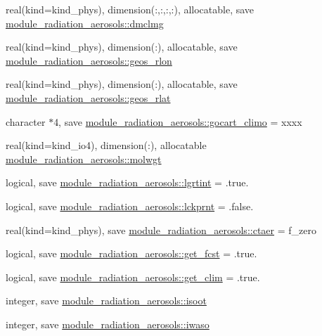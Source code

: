 \begin{DoxyCompactItemize}
\item 
real(kind=kind\+\_\+phys), dimension(\+:,\+:,\+:,\+:), allocatable, save \hyperlink{group__module__radiation__aerosols_ga123d552c7f98f7371565f4e2017efd45}{module\+\_\+radiation\+\_\+aerosols\+::dmclmg}
\item 
real(kind=kind\+\_\+phys), dimension(\+:), allocatable, save \hyperlink{group__module__radiation__aerosols_ga1a0e35ab33517e765898870b8b1ab1ad}{module\+\_\+radiation\+\_\+aerosols\+::geos\+\_\+rlon}
\item 
real(kind=kind\+\_\+phys), dimension(\+:), allocatable, save \hyperlink{group__module__radiation__aerosols_gaef43bfbd28ef9b87e8d6973ba7331a18}{module\+\_\+radiation\+\_\+aerosols\+::geos\+\_\+rlat}
\item 
character $\ast$4, save \hyperlink{group__module__radiation__aerosols_gab8118108e60a4795a8caa5af71232399}{module\+\_\+radiation\+\_\+aerosols\+::gocart\+\_\+climo} = \textquotesingle{}xxxx\textquotesingle{}
\item 
real(kind=kind\+\_\+io4), dimension(\+:), allocatable \hyperlink{group__module__radiation__aerosols_ga166e63abaa518ec795f8eea6d115f03c}{module\+\_\+radiation\+\_\+aerosols\+::molwgt}
\item 
logical, save \hyperlink{group__module__radiation__aerosols_gaa27bf6912bfd67b78381892d4f555c51}{module\+\_\+radiation\+\_\+aerosols\+::lgrtint} = .true.
\item 
logical, save \hyperlink{group__module__radiation__aerosols_ga018d5414597049069c1ddd1094285371}{module\+\_\+radiation\+\_\+aerosols\+::lckprnt} = .false.
\item 
real(kind=kind\+\_\+phys), save \hyperlink{group__module__radiation__aerosols_ga4b0aa142aee31c40361dadc390ccc68e}{module\+\_\+radiation\+\_\+aerosols\+::ctaer} = f\+\_\+zero
\item 
logical, save \hyperlink{group__module__radiation__aerosols_ga36f851e49de5e1f7da38da5fa6ea445c}{module\+\_\+radiation\+\_\+aerosols\+::get\+\_\+fcst} = .true.
\item 
logical, save \hyperlink{group__module__radiation__aerosols_ga7fe1943010fe47c9d86ef4c993848459}{module\+\_\+radiation\+\_\+aerosols\+::get\+\_\+clim} = .true.
\item 
integer, save \hyperlink{group__module__radiation__aerosols_gaa9aa876f65d1e1e971607bff4ffbddad}{module\+\_\+radiation\+\_\+aerosols\+::isoot}
\item 
integer, save \hyperlink{group__module__radiation__aerosols_gad15292f4a185c28ad44687d95ef4d3a4}{module\+\_\+radiation\+\_\+aerosols\+::iwaso}

\end{DoxyCompactItemize}
